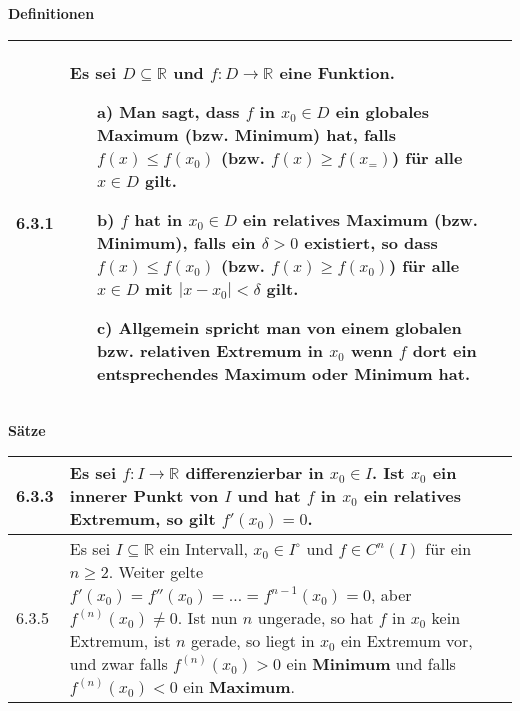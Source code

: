     \noindent
    \textbf{Definitionen}
    \begin{table}[H]  
    \begin{tabularx}{\textwidth}{X m{16cm}}
        \toprule

        6.3.1 & Es sei $D \subseteq \mathbb{R}$ und $f: D \rightarrow \mathbb{R}$ eine Funktion.
                \begin{itemize}[topsep=-0.5cm]
                    \item[a)] Man sagt, dass $f$ in $x_0 \in D$ ein \textbf{globales Maximum} (bzw. Minimum) hat, falls $f(x) \leq f(x_0)$
                                (bzw. $f(x) \geq f(x_=)$) für alle $x \in D$ gilt.
                    \item[b)] $f$ hat in $x_0 \in D$ ein \textbf{relatives Maximum} (bzw. Minimum), falls ein $\delta > 0$ existiert, so dass $f(x) \leq f(x_0)$
                                (bzw. $f(x) \geq f(x_0)$) für alle $x \in D$ mit $|x-x_0| < \delta$ gilt.
                    \item[c)] Allgemein spricht man von einem globalen bzw. relativen \textbf{Extremum} in $x_0$ wenn $f$ dort ein entsprechendes
                                Maximum oder Minimum hat.
                \end{itemize} \vspace{-0cm} \\

        \bottomrule

    \end{tabularx}
    \end{table}

    \noindent 
    \textbf{Sätze}
    \begin{table}[H]
    \begin{tabularx}{\textwidth}{X m{16cm}}
        \toprule

        6.3.3 & Es sei $f: I \rightarrow \mathbb{R}$ differenzierbar in $x_0 \in I$. Ist $x_0$ ein innerer Punkt von $I$ und hat $f$ in $x_0$
                ein relatives Extremum, so gilt $f'(x_0) = 0$. \\
        \midrule
        6.3.5 & Es sei $I \subseteq \mathbb{R}$ ein Intervall, $x_0 \in I^{\circ}$ und $f \in C^n(I)$ für ein $n \geq 2$. Weiter gelte
                $f'(x_0) = f''(x_0) = \dots = f^{n-1}(x_0) = 0$, aber $f^{(n)}(x_0) \neq 0$. Ist nun $n$ ungerade, so hat $f$ in $x_0$ kein
                Extremum, ist $n$ gerade, so liegt in $x_0$ ein Extremum vor, und zwar falls $f^{(n)}(x_0) > 0$ ein \textbf{Minimum} und falls
                $f^{(n)}(x_0) < 0$ ein \textbf{Maximum}. \\

        \bottomrule
    \end{tabularx}
    \end{table}

